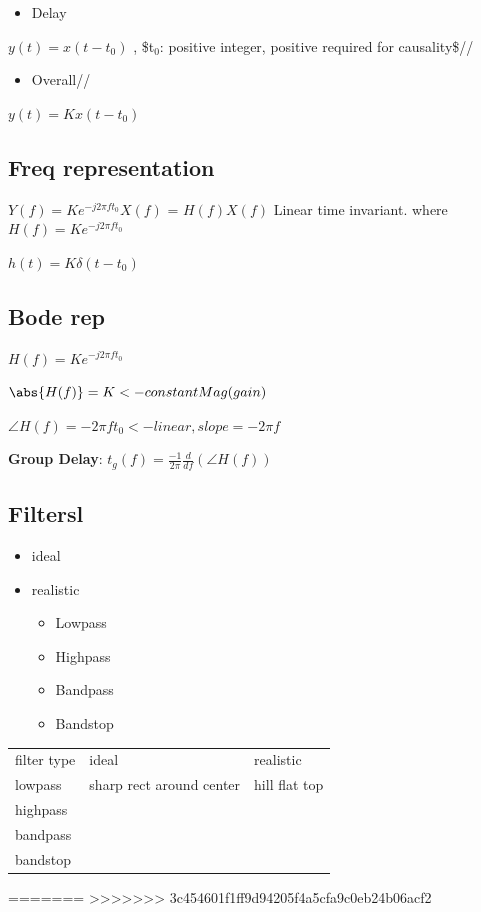 \documentclass[11pt]{article}
\begin{document}
\begin{itemize}
\item Delay \\
\end{itemize}
$y(t) = x(t-t_0)$ , \$t$_{\text{0}}$: positive integer, positive required for causality\$//

\begin{itemize}
\item Overall//
\end{itemize}
$y(t) = K x(t-t_0)$

\subsection{Freq representation}
\label{sec-2-2}

$Y(f)  = K e^{-j2\pi ft_0} X(f)$
  = $H(f)X(f)$ Linear time invariant.
where $H(f) = Ke^{-j2\pi ft_0}$

$h(t) = K\delta(t-t_0)$

\subsection{Bode rep}
\label{sec-2-3}
$H(f) = Ke^{-j2\pi ft_0}$

$\abs{H(f)} = K <- constant Mag(gain)$

$\angle{H(f)} = -2\pi ft_0 <- linear, slope = -2\pi f$


\textbf{Group Delay}: $t_g(f) = \frac{-1}{2\pi} \frac{d}{df}(\angle{H(f)})$

\subsection{Filtersl}
\label{sec-2-4}
\begin{itemize}
\item ideal\\
\item realistic
\begin{itemize}
\item Lowpass
\item Highpass
\item Bandpass
\item Bandstop
\end{itemize}
\end{itemize}

\begin{center}
\begin{tabular}{lll}
filter type & ideal & realistic\\
lowpass & sharp rect around center & hill flat top\\
highpass &  & \\
bandpass &  & \\
bandstop &  & \\
\end{tabular}
\end{center}
=======
>>>>>>> 3c454601f1ff9d94205f4a5cfa9c0eb24b06acf2
\end{document}
